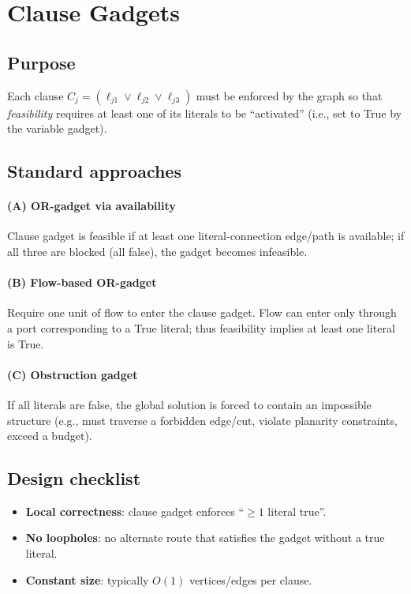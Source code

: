\documentclass[11pt]{article}
\begin{document}
\section{Clause Gadgets}
\subsection{Purpose}
Each clause $C_j=(\ell_{j1}\lor \ell_{j2}\lor \ell_{j3})$ must be enforced by the graph so that \emph{feasibility} requires at least one of its literals to be ``activated'' (i.e., set to True by the variable gadget).

\subsection{Standard approaches}
\paragraph{(A) OR-gadget via availability}
Clause gadget is feasible if at least one literal-connection edge/path is available; if all three are blocked (all false), the gadget becomes infeasible.

\paragraph{(B) Flow-based OR-gadget}
Require one unit of flow to enter the clause gadget. Flow can enter only through a port corresponding to a True literal; thus feasibility implies at least one literal is True.

\paragraph{(C) Obstruction gadget}
If all literals are false, the global solution is forced to contain an impossible structure (e.g., must traverse a forbidden edge/cut, violate planarity constraints, exceed a budget).

\subsection{Design checklist}
\begin{itemize}[itemsep=2pt]
  \item \textbf{Local correctness}: clause gadget enforces ``$\ge 1$ literal true''.
  \item \textbf{No loopholes}: no alternate route that satisfies the gadget without a true literal.
  \item \textbf{Constant size}: typically $O(1)$ vertices/edges per clause.
\end{itemize}
\end{document}
